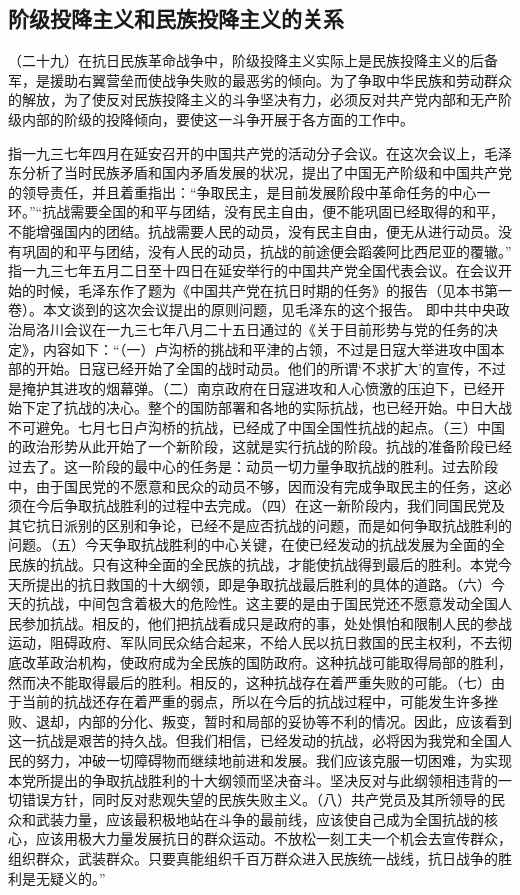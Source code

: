 \subsection{阶级投降主义和民族投降主义的关系}

（二十九）在抗日民族革命战争中，阶级投降主义实际上是民族投降主义的后备军，是援助右翼营垒而使战争失败的最恶劣的倾向。为了争取中华民族和劳动群众的解放，为了使反对民族投降主义的斗争坚决有力，必须反对共产党内部和无产阶级内部的阶级的投降倾向，要使这一斗争开展于各方面的工作中。


\begin{maonote}
指一九三七年四月在延安召开的中国共产党的活动分子会议。在这次会议上，毛泽东分析了当时民族矛盾和国内矛盾发展的状况，提出了中国无产阶级和中国共产党的领导责任，并且着重指出：“争取民主，是目前发展阶段中革命任务的中心一环。”“抗战需要全国的和平与团结，没有民主自由，便不能巩固已经取得的和平，不能增强国内的团结。抗战需要人民的动员，没有民主自由，便无从进行动员。没有巩固的和平与团结，没有人民的动员，抗战的前途便会蹈袭阿比西尼亚的覆辙。”
指一九三七年五月二日至十四日在延安举行的中国共产党全国代表会议。在会议开始的时候，毛泽东作了题为《中国共产党在抗日时期的任务》的报告（见本书第一卷）。本文谈到的这次会议提出的原则问题，见毛泽东的这个报告。
即中共中央政治局洛川会议在一九三七年八月二十五日通过的《关于目前形势与党的任务的决定》，内容如下：“（一）卢沟桥的挑战和平津的占领，不过是日寇大举进攻中国本部的开始。日寇已经开始了全国的战时动员。他们的所谓‘不求扩大’的宣传，不过是掩护其进攻的烟幕弹。（二）南京政府在日寇进攻和人心愤激的压迫下，已经开始下定了抗战的决心。整个的国防部署和各地的实际抗战，也已经开始。中日大战不可避免。七月七日卢沟桥的抗战，已经成了中国全国性抗战的起点。（三）中国的政治形势从此开始了一个新阶段，这就是实行抗战的阶段。抗战的准备阶段已经过去了。这一阶段的最中心的任务是：动员一切力量争取抗战的胜利。过去阶段中，由于国民党的不愿意和民众的动员不够，因而没有完成争取民主的任务，这必须在今后争取抗战胜利的过程中去完成。（四）在这一新阶段内，我们同国民党及其它抗日派别的区别和争论，已经不是应否抗战的问题，而是如何争取抗战胜利的问题。（五）今天争取抗战胜利的中心关键，在使已经发动的抗战发展为全面的全民族的抗战。只有这种全面的全民族的抗战，才能使抗战得到最后的胜利。本党今天所提出的抗日救国的十大纲领，即是争取抗战最后胜利的具体的道路。（六）今天的抗战，中间包含着极大的危险性。这主要的是由于国民党还不愿意发动全国人民参加抗战。相反的，他们把抗战看成只是政府的事，处处惧怕和限制人民的参战运动，阻碍政府、军队同民众结合起来，不给人民以抗日救国的民主权利，不去彻底改革政治机构，使政府成为全民族的国防政府。这种抗战可能取得局部的胜利，然而决不能取得最后的胜利。相反的，这种抗战存在着严重失败的可能。（七）由于当前的抗战还存在着严重的弱点，所以在今后的抗战过程中，可能发生许多挫败、退却，内部的分化、叛变，暂时和局部的妥协等不利的情况。因此，应该看到这一抗战是艰苦的持久战。但我们相信，已经发动的抗战，必将因为我党和全国人民的努力，冲破一切障碍物而继续地前进和发展。我们应该克服一切困难，为实现本党所提出的争取抗战胜利的十大纲领而坚决奋斗。坚决反对与此纲领相违背的一切错误方针，同时反对悲观失望的民族失败主义。（八）共产党员及其所领导的民众和武装力量，应该最积极地站在斗争的最前线，应该使自己成为全国抗战的核心，应该用极大力量发展抗日的群众运动。不放松一刻工夫一个机会去宣传群众，组织群众，武装群众。只要真能组织千百万群众进入民族统一战线，抗日战争的胜利是无疑义的。”

\end{maonote}
